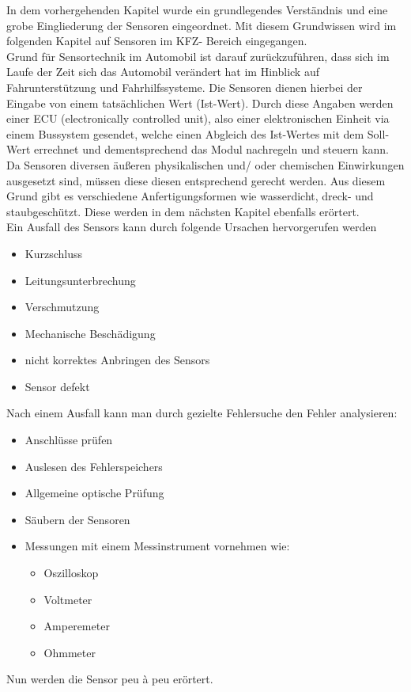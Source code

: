 			\begin{flushleft}
				In dem vorhergehenden Kapitel wurde ein grundlegendes Verständnis und eine grobe Eingliederung der Sensoren eingeordnet. Mit diesem Grundwissen wird im folgenden Kapitel auf Sensoren im KFZ- Bereich eingegangen.\\
				Grund für Sensortechnik im Automobil ist darauf zurückzuführen, dass sich im Laufe der Zeit sich das Automobil verändert hat im Hinblick auf Fahrunterstützung und Fahrhilfssysteme.
				Die Sensoren dienen hierbei der Eingabe von einem tatsächlichen Wert (Ist-Wert). Durch diese Angaben werden einer ECU (electronically controlled unit), also einer elektronischen Einheit via einem Bussystem gesendet, welche einen Abgleich des Ist-Wertes mit dem Soll-Wert errechnet und dementsprechend das Modul nachregeln und steuern kann. \\ 
				Da Sensoren diversen äußeren physikalischen und/ oder chemischen Einwirkungen ausgesetzt sind, müssen diese diesen entsprechend gerecht werden. Aus diesem Grund gibt es verschiedene Anfertigungsformen wie wasserdicht, dreck- und staubgeschützt. Diese werden in dem nächsten Kapitel ebenfalls erörtert.\\  
				
				Ein Ausfall des Sensors kann durch folgende Ursachen hervorgerufen werden
				\begin{itemize}
					\item Kurzschluss
					\item Leitungsunterbrechung
					\item Verschmutzung
					\item Mechanische Beschädigung
					\item nicht korrektes Anbringen des Sensors
					\item Sensor defekt
				\end{itemize}	
				
				Nach einem Ausfall kann man durch gezielte Fehlersuche den Fehler analysieren:
				\begin{itemize}
					\item Anschlüsse prüfen
					\item Auslesen des Fehlerspeichers
					\item Allgemeine optische Prüfung
					\item Säubern der Sensoren
					\item Messungen mit einem Messinstrument vornehmen wie:
					\begin{itemize}
						\item Oszilloskop 
						\item Voltmeter
						\item Amperemeter
						\item Ohmmeter	
					\end{itemize}
					
				\end{itemize}					

				Nun werden die Sensor peu à peu erörtert. 



		\end{flushleft}	
		

